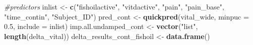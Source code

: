 \documentclass{article}
\newenvironment{Shaded}{\begin{snugshade}}{\end{snugshade}}
\newcommand{\AttributeTok}[1]{\textcolor[rgb]{0.13,0.29,0.53}{#1}}
\newcommand{\CommentTok}[1]{\textcolor[rgb]{0.56,0.35,0.01}{\textit{#1}}}
\newcommand{\FloatTok}[1]{\textcolor[rgb]{0.00,0.00,0.81}{#1}}
\newcommand{\FunctionTok}[1]{\textcolor[rgb]{0.13,0.29,0.53}{\textbf{#1}}}
\newcommand{\NormalTok}[1]{#1}
\newcommand{\OtherTok}[1]{\textcolor[rgb]{0.56,0.35,0.01}{#1}}
\newcommand{\StringTok}[1]{\textcolor[rgb]{0.31,0.60,0.02}{#1}}
\begin{document}
\begin{Shaded}
\begin{Highlighting}[]
\CommentTok{\#predictors}
\NormalTok{inlist }\OtherTok{\textless{}{-}} \FunctionTok{c}\NormalTok{(}\StringTok{"fishoilactive"}\NormalTok{, }\StringTok{"vitdactive"}\NormalTok{, }\StringTok{"pain"}\NormalTok{, }\StringTok{"pain\_base"}\NormalTok{, }\StringTok{"time\_contin"}\NormalTok{, }\StringTok{"Subject\_ID"}\NormalTok{) }
\NormalTok{pred\_cont }\OtherTok{\textless{}{-}} \FunctionTok{quickpred}\NormalTok{(vital\_wide, }\AttributeTok{minpuc =} \FloatTok{0.5}\NormalTok{, }\AttributeTok{include =}\NormalTok{ inlist)}
\NormalTok{imp.all.undamped\_cont }\OtherTok{\textless{}{-}} \FunctionTok{vector}\NormalTok{(}\StringTok{"list"}\NormalTok{, }\FunctionTok{length}\NormalTok{(delta\_vital))}
\NormalTok{delta\_results\_cont\_fishoil }\OtherTok{\textless{}{-}} \FunctionTok{data.frame}\NormalTok{()}


\end{Highlighting}
\end{Shaded}
\end{document}
